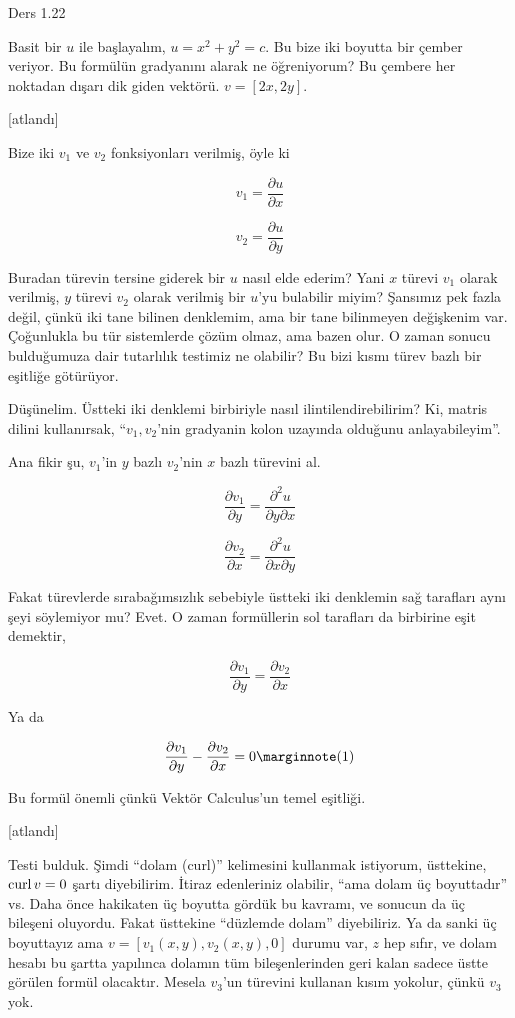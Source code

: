 \documentclass[12pt,fleqn]{article}\usepackage{../../common}
\begin{document}
Ders 1.22

Basit bir $u$ ile başlayalım, $u = x^2 + y^2 = c$. Bu bize iki boyutta bir
çember veriyor. Bu formülün gradyanını alarak ne öğreniyorum? Bu çembere her
noktadan dışarı dik giden vektörü. $v = [2x, 2y]$.

[atlandı]

Bize iki $v_1$ ve $v_2$ fonksiyonları verilmiş, öyle ki

$$
v_1 = \frac{\partial u}{\partial x}
$$

$$
v_2 = \frac{\partial u}{\partial y}
$$

Buradan türevin tersine giderek bir $u$ nasıl elde ederim? Yani $x$ türevi $v_1$
olarak verilmiş, $y$ türevi $v_2$ olarak verilmiş bir $u$'yu bulabilir miyim?
Şansımız pek fazla değil, çünkü iki tane bilinen denklemim, ama bir tane
bilinmeyen değişkenim var. Çoğunlukla bu tür sistemlerde çözüm olmaz, ama bazen
olur. O zaman sonucu bulduğumuza dair tutarlılık testimiz ne olabilir?
Bu bizi kısmı türev bazlı bir eşitliğe götürüyor.

Düşünelim. Üstteki iki denklemi birbiriyle nasıl ilintilendirebilirim? Ki,
matris dilini kullanırsak, ``$v_1,v_2$'nin gradyanin kolon uzayında olduğunu
anlayabileyim''. 

Ana fikir şu, $v_1$'in $y$ bazlı $v_2$'nin $x$ bazlı türevini al.

$$
\frac{\partial v_1}{\partial y} = \frac{\partial^2 u}{\partial y \partial x}
$$

$$
\frac{\partial v_2}{\partial x} = \frac{\partial^2 u}{\partial x \partial y}
$$

Fakat türevlerde sırabağımsızlık sebebiyle üstteki iki denklemin sağ tarafları
aynı şeyi söylemiyor mu? Evet. O zaman formüllerin sol tarafları da birbirine
eşit demektir,

$$
\frac{\partial v_1}{\partial y} = \frac{\partial v_2}{\partial x} 
$$

Ya da

$$
\frac{\partial v_1}{\partial y} - \frac{\partial v_2}{\partial x} = 0
\mlabel{1}
$$

Bu formül önemli çünkü Vektör Calculus'un temel eşitliği.

[atlandı]

Testi bulduk. Şimdi ``dolam (curl)'' kelimesini kullanmak istiyorum, üsttekine,
$\operatorname{curl} v = 0$ şartı diyebilirim. İtiraz edenleriniz olabilir, ``ama dolam üç
boyuttadır'' vs. Daha önce hakikaten üç boyutta gördük bu kavramı, ve sonucun da
üç bileşeni oluyordu. Fakat üsttekine ``düzlemde dolam'' diyebiliriz.  Ya da
sanki üç boyuttayız ama $v = [v_1(x,y), v_2(x,y), 0]$ durumu var, $z$ hep sıfır,
ve dolam hesabı bu şartta yapılınca dolamın tüm bileşenlerinden geri kalan
sadece üstte görülen formül olacaktır. Mesela $v_3$'un türevini kullanan kısım
yokolur, çünkü $v_3$ yok.
\end{document}
